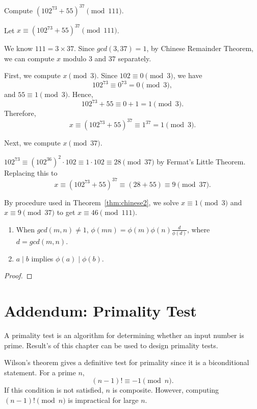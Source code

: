 \begin{eg}
    Compute $(102^{73} + 55)^{37} \pmod{111}$.
\end{eg}
\begin{explanation}
    Let $x \equiv (102^{73} + 55)^{37} \pmod{111}$. 

    We know $111 = 3 \times 37$. Since $gcd(3,37) = 1$, by Chinese Remainder Theorem, we can compute $x$ modulo $3$ and $37$ separately.

    First, we compute $x \pmod{3}$. Since $102 \equiv 0 \pmod{3}$, we have \[102^{73} \equiv 0^{73} = 0 \pmod{3},\] and $55 \equiv 1 \pmod{3}$. Hence, \[102^{73} + 55 \equiv 0 + 1 = 1 \pmod{3}.\] Therefore, \[x \equiv (102^{73} + 55)^{37} \equiv 1^{37} = 1 \pmod{3}.\]

    Next, we compute $x \pmod{37}$.

    $102^{73} \equiv (102^{36})^2 \cdot 102 \equiv 1 \cdot 102 \equiv 28 \pmod{37}$ by Fermat's Little Theorem. 
    Replacing this to 
    \[x \equiv (102^{73} + 55)^{37} \equiv (28+55) \equiv 9 \pmod{37}.\]

    By procedure used in Theorem~\ref{thm:chinese2}, we solve $x \equiv 1 \pmod{3}$ and $x \equiv 9 \pmod{37}$ to get $x \equiv 46 \pmod{111}$.
\end{explanation}

\begin{prop}
    \begin{enumerate}
        \item When $gcd(m,n) \neq 1$, $\phi(mn) = \phi(m) \phi(n) \frac{d}{\phi(d)}$, where $d = gcd(m,n)$.
        \item $a \mid b$ implies $\phi(a) \mid \phi(b)$.
    \end{enumerate}
\end{prop}
\begin{proof}
    
\end{proof}

\section{Addendum: Primality Test}
A primality test is an algorithm for determining whether an input number is prime. Result's of this chapter can be used to design primality tests.

Wilson's theorem gives a definitive test for primality since it is a biconditional statement. For a prime \( n \),
\[
(n-1)! \equiv -1 \pmod{n}.
\]
If this condition is not satisfied, \( n \) is composite. However, computing \( (n-1)! \pmod{n} \) is impractical for large \( n \).

